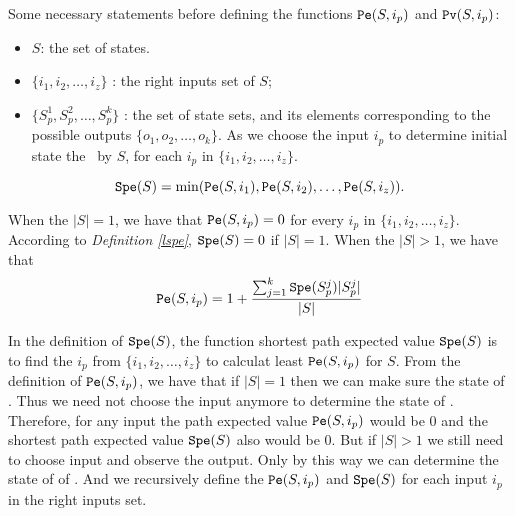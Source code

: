 Some necessary statements before defining the functions $\Pe(S, i_p)$ and ${\tt Pv}(S, i_p)$:
\begin{itemize}
  \item $S$: the set of states.
  \item $\{i_1,i_2,\ldots, i_z\}$ : the right inputs set of $S$;
  \item $\{S_p^1,S_p^2,\ldots, S_p^k\}$ : the set of state sets, and its elements corresponding to the possible outputs $\{o_1,o_2,\ldots,o_k\}$. As we choose the input $i_p$ to determine initial state the \BCN\ by $S$, for each $i_p$ in $\{i_1,i_2,\ldots, i_z\}$.
\end{itemize} 
\begin{definition}[$\Spe(S)$] \label{lspe}
 \[{\tt Spe}(S)= \min({\tt Pe}(S, i_1),{\tt Pe}(S, i_2),\ldots,{\tt Pe}(S, i_z)).\] 
\end{definition}

\begin{definition}[$\Pe(S, i_p)$] 
When the $|S|=1$, we have that
${\tt Pe}(S, i_p)=0$  for every $i_p$ in $\{i_1,i_2,\ldots, i_z\}$. According to {\em Definition \ref{lspe}}, ${\tt Spe}(S)=0$ if $|S|=1$. When the $|S|>1$, 
we have that  
\[{\tt Pe}(S, i_p)=1 +\frac{\sum_{j=1}^k {\tt Spe}(S_p^j)|S_p^j|}{ |S|}\] 
\end{definition}

In the definition of $\Spe(S)$, the function shortest path  expected value $\Spe(S)$ is to find the $i_p$ from $\{i_1,i_2,\ldots, i_z\}$ to calculat least $\Pe(S, i_p)$ for $S$. From the definition of $\Pe(S, i_p)$, we have that if $|S|=1$ then we can make sure the state of \BCNs. Thus we need not choose the input anymore to determine the state of \BCNs. Therefore, for any input the path expected value $\Pe(S, i_p)$ would be $0$ and the shortest path expected value $\Spe(S)$ also would be $0$. But if $|S|>1$ we still need to choose input and observe the output. Only by this way we can determine the state of of \BCNs. And we recursively define the $\Pe(S, i_p)$ and $\Spe(S)$ for each input $i_p$ in the right inputs set. 

